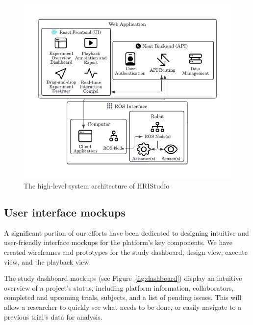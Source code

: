 \documentclass[letterpaper, 10 pt, conference]{ieeeconf}
\begin{document}
\begin{figure}[ht]
   \vskip -0.3cm
    \begin{center}
        \includegraphics[width=0.4\paperwidth]{assets/diagrams/systemarch}
        \vskip -0.3cm
        \caption{The high-level system architecture of HRIStudio}
        \label{fig:systemarch}
    \end{center}
     \vskip -0.7cm
\end{figure}

\subsection{User interface mockups}

A significant portion of our efforts have been dedicated to designing intuitive and user-friendly interface mockups for the platform's key components. We have created wireframes and prototypes for the study dashboard, design view, execute view, and the playback view.

The study dashboard mockups (see Figure~\ref{fig:dashboard}) display an intuitive overview of a project's status, including platform information, collaborators, completed and upcoming trials, subjects, and a list of pending issues. This will allow a researcher to quickly see what needs to be done, or easily navigate to a previous trial's data for analysis.
\end{document}
